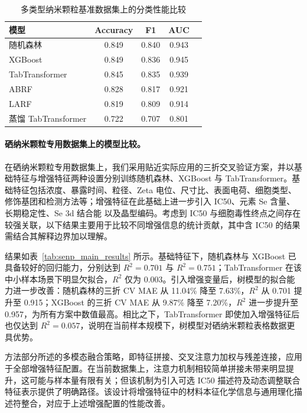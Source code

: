 \begin{table}[htbp]
  \centering
  \caption{多类型纳米颗粒基准数据集上的分类性能比较}
  \label{tab:benchmark_classification}
  \begin{tabular}{lcccc}
    \hline
    模型 & Accuracy & F1 & AUC \\
    \hline
    随机森林 & 0.849 & 0.840 & 0.943 \\
    XGBoost & 0.849 & 0.836 & 0.945 \\
    TabTransformer & 0.845 & 0.835 & 0.939 \\
    ABRF & 0.828 & 0.817 & 0.921 \\
    LARF & 0.819 & 0.809 & 0.914 \\
    蒸馏 TabTransformer & 0.722 & 0.707 & 0.801 \\
    \hline
  \end{tabular}
\end{table}

\paragraph{硒纳米颗粒专用数据集上的模型比较。}
在硒纳米颗粒专用数据集上，我们采用贴近实际应用的三折交叉验证方案，并以基础特征与增强特征两种设置分别训练随机森林、XGBoost 与 TabTransformer。基础特征包括浓度、暴露时间、粒径、Zeta 电位、尺寸比、表面电荷、细胞类型、修饰基团和检测方法等；增强特征在此基础上进一步引入 IC50、元素 Se 含量、长期稳定性、Se 3d 结合能 以及晶型编码。考虑到 IC50 与细胞毒性终点之间存在较强关联，以下结果主要用于比较不同增强信息的统计贡献，其中含 IC50 的结果需结合其解释边界加以理解。

结果如表~\ref{tab:senp_main_results} 所示。基础特征下，随机森林与 XGBoost 已具备较好的回归能力，分别达到 $R^2=0.701$ 与 $R^2=0.751$；TabTransformer 在该中小样本场景下明显欠拟合，$R^2$ 仅为 0.003。引入增强变量后，树模型的拟合能力进一步改善：随机森林的三折 CV MAE 从 11.04\% 降至 7.63\%，$R^2$ 从 0.701 提升至 0.915；XGBoost 的三折 CV MAE 从 9.87\% 降至 7.20\%，$R^2$ 进一步提升至 0.957，为所有方案中数值最高。相比之下，TabTransformer 即使加入增强特征后也仅达到 $R^2=0.057$，说明在当前样本规模下，树模型对硒纳米颗粒表格数据更具优势。

方法部分所述的多模态融合策略，即特征拼接、交叉注意力加权与残差连接，应用于全部增强特征配置。在当前数据集上，注意力机制相较简单拼接未带来明显提升，这可能与样本量有限有关；但该机制为引入可选 IC50 描述符及动态调整联合特征表示提供了明确路径。该设计将增强特征中的材料本征化学信息与通用理化描述符整合，对应于上述增强配置的性能改善。

